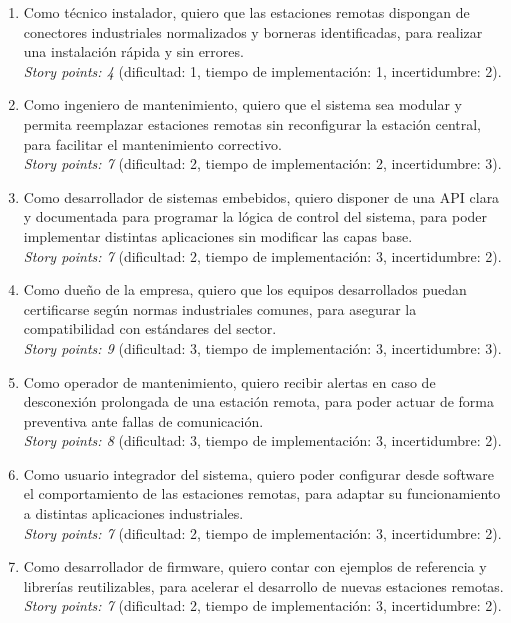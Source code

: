 \documentclass[
11pt, %
]{charter}
\begin{document}
\begin{enumerate}
	\item Como técnico instalador, quiero que las estaciones remotas dispongan de conectores industriales normalizados y borneras identificadas, para realizar una instalación rápida y sin errores.\\
	\textit{Story points: 4} (dificultad: 1, tiempo de implementación: 1, incertidumbre: 2).
	
	\item Como ingeniero de mantenimiento, quiero que el sistema sea modular y permita reemplazar estaciones remotas sin reconfigurar la estación central, para facilitar el mantenimiento correctivo.\\
	\textit{Story points: 7} (dificultad: 2, tiempo de implementación: 2, incertidumbre: 3).
	
	\item Como desarrollador de sistemas embebidos, quiero disponer de una API clara y documentada para programar la lógica de control del sistema, para poder implementar distintas aplicaciones sin modificar las capas base.\\
	\textit{Story points: 7} (dificultad: 2, tiempo de implementación: 3, incertidumbre: 2).
	
	\item Como dueño de la empresa, quiero que los equipos desarrollados puedan certificarse según normas industriales comunes, para asegurar la compatibilidad con estándares del sector.\\
	\textit{Story points: 9} (dificultad: 3, tiempo de implementación: 3, incertidumbre: 3).
	
	\item Como operador de mantenimiento, quiero recibir alertas en caso de desconexión prolongada de una estación remota, para poder actuar de forma preventiva ante fallas de comunicación.\\
	\textit{Story points: 8} (dificultad: 3, tiempo de implementación: 3, incertidumbre: 2).
	
	\item Como usuario integrador del sistema, quiero poder configurar desde software el comportamiento de las estaciones remotas, para adaptar su funcionamiento a distintas aplicaciones industriales.\\
	\textit{Story points: 7} (dificultad: 2, tiempo de implementación: 3, incertidumbre: 2).
	
	\item Como desarrollador de firmware, quiero contar con ejemplos de referencia y librerías reutilizables, para acelerar el desarrollo de nuevas estaciones remotas.\\
	\textit{Story points: 7} (dificultad: 2, tiempo de implementación: 3, incertidumbre: 2).
\end{enumerate}
\end{document}
